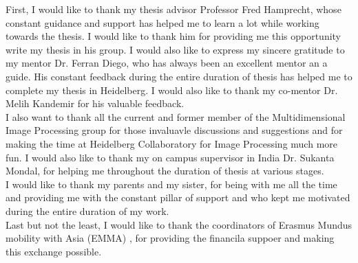 
\begin{acknowledgements}      

First, I would like to thank my thesis advisor Professor Fred Hamprecht, whose constant guidance and support has helped me to learn a lot while working towards the thesis. I would like to thank him for providing me this opportunity write my thesis in his group. I would also like to express my sincere gratitude to my mentor Dr. Ferran Diego, who has always been an excellent mentor an a guide. His constant feedback during the entire duration of thesis has helped me to complete my thesis in Heidelberg. I would also like to thank my co-mentor Dr. Melih Kandemir for his valuable feedback.\\

I also want to thank all the current and former member of the Multidimensional Image Processing group for those invaluavle discussions and suggestions and  for making the time at Heidelberg Collaboratory for Image Processing much more fun.
I would also like to thank my on campus supervisor in India Dr. Sukanta Mondal, for helping me throughout the duration of thesis at various stages.\\

I would like to thank my parents and my sister, for being with me all the time and providing me with the constant pillar of support and who kept me motivated during the entire duration of my work.\\

Last but not the least, I would like to thank the coordinators of Erasmus Mundus mobility with Asia (EMMA) , for providing the financila suppoer and making this exchange possible. 


\end{acknowledgements}
